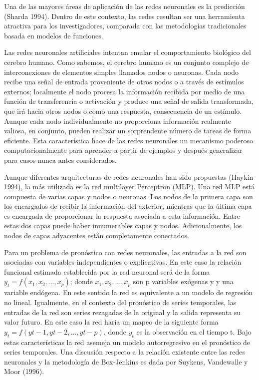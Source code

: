 \hspace*{0.4 cm} Una de las mayores \'areas de aplicaci\'on de las redes neuronales es la predicci\'on (Sharda 1994). Dentro de este contexto, las redes resultan ser una herramienta atractiva para los investigadores, comparada con las metodolog\'ias tradicionales basada en modelos de funciones.

\hspace*{0.4 cm} Las redes neuronales artificiales intentan emular el comportamiento biol\'ogico del cerebro humano. Como sabemos, el cerebro humano es un conjunto complejo de interconexiones de elementos simples llamados nodos o neuronas. Cada nodo recibe una se\~nal de entrada proveniente de otros nodos o a trav\'es de est\'imulos externos; localmente el nodo procesa la informaci\'on recibida por medio de una funci\'on de transferencia o activaci\'on y produce una se\~nal de salida transformada, que ir\'a hacia otros nodos o como una respuesta, consecuencia de un est\'imulo. Aunque cada nodo individualmente no proporciona informaci\'on realmente valiosa, en conjunto, pueden realizar un sorprendente n\'umero de tareas de forma eficiente. Esta caracter\'istica hace de las redes neuronales un mecanismo poderoso computacionalmente para aprender a partir de ejemplos y despu\'es generalizar para casos nunca antes considerados.


\hspace*{0.4 cm} Aunque diferentes arquitecturas de redes neuronales han sido propuestas (Haykin 1994), la m\'as utilizada es la red multilayer Perceptron (MLP). Una red MLP est\'a compuesta de varias capas y nodos o neuronas. Los nodos de la primera capa son los encargados de recibir la informaci\'on del exterior, mientras que la \'ultima capa es encargada de proporcionar la respuesta asociada a esta informaci\'on. Entre estas dos capas puede haber innumerables capas y nodos. Adicionalmente, los nodos de capas adyacentes est\'an completamente conectados.

\hspace*{0.4 cm} Para un problema de pron\'ostico con redes neuronales, las entradas a la red son asociadas con variables independientes o explicativas. En este caso la relaci\'on funcional estimada establecida por la red neuronal ser\'a de la forma $y_{t}=f(x_{1}, x_{2},..., x_{p})$; donde $x_{1}, x_{2},..., x_{p}$ son p variables ex\'ogenas y y una variable end\'ogena. En este sentido la red es equivalente a un modelo de regresi\'on no lineal. Igualmente, en el contexto del pron\'ostico de series temporales, las entradas de la red son series rezagadas de la original y la salida representa su valor futuro. En este caso la red har\'ia un mapeo de la siguiente forma $y_{t}= f (y{t-1}, y{t-2}, ..., y{t-p})$, donde $y_{t}$ es la observaci\'on en el tiempo t. Bajo estas caracter\'isticas la red asemeja un modelo autorregresivo en el pron\'ostico de series temporales. Una discusi\'on respecto a la relaci\'on existente entre las redes neuronales y la metodolog\'ia de Box-Jenkins es dada por Suykens, Vandewalle y Moor (1996).

